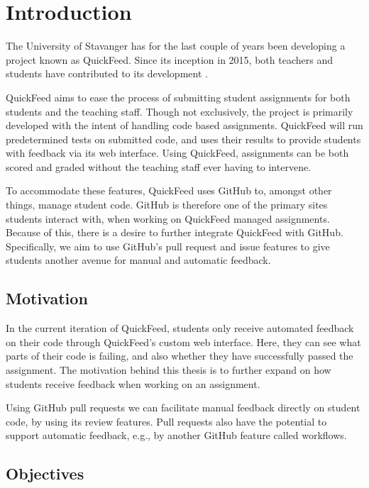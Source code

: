 
\chapter{Introduction}
\label{ch:intro}

The University of Stavanger has for the last couple of years been developing a project known as QuickFeed.
Since its inception in 2015, both teachers and students have contributed to its development \cite{autograder, reactjs, redesign, grpc}.

QuickFeed aims to ease the process of submitting student assignments for both students and the teaching staff.
Though not exclusively, the project is primarily developed with the intent of handling code based assignments.
QuickFeed will run predetermined tests on submitted code, and uses their results to provide students with feedback via its web interface.
Using QuickFeed, assignments can be both scored and graded without the teaching staff ever having to intervene.

To accommodate these features, QuickFeed uses GitHub to, amongst other things, manage student code.
GitHub is therefore one of the primary sites students interact with, when working on QuickFeed managed assignments.
Because of this, there is a desire to further integrate QuickFeed with GitHub.
Specifically, we aim to use GitHub's pull request and issue features to give students another avenue for manual and automatic feedback.

\section{Motivation}
\label{sec:motivation}

In the current iteration of QuickFeed, students only receive automated feedback on their code through QuickFeed's custom web interface.
Here, they can see what parts of their code is failing, and also whether they have successfully passed the assignment.
The motivation behind this thesis is to further expand on how students receive feedback when working on an assignment.

Using GitHub pull requests we can facilitate manual feedback directly on student code, by using its review features.
Pull requests also have the potential to support automatic feedback, e.g., by another GitHub feature called workflows.

\section{Objectives}

